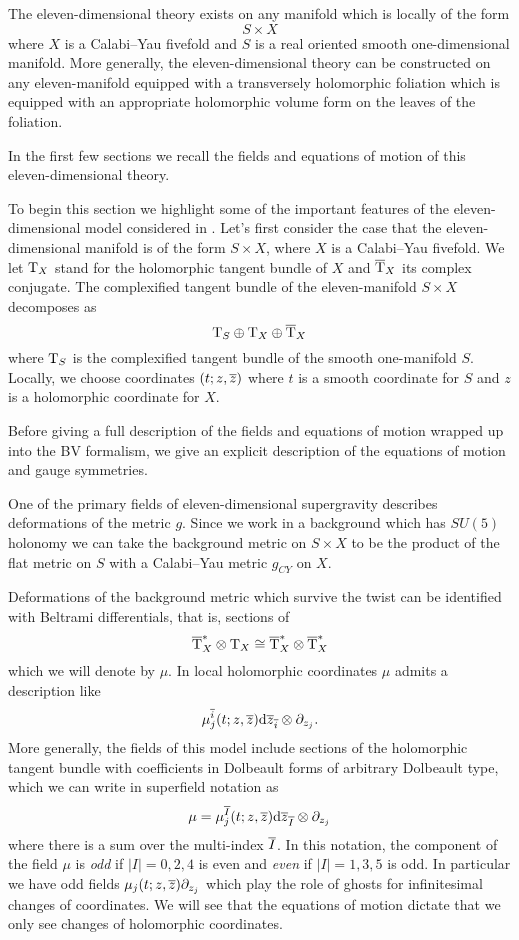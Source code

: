 \documentclass[11pt]{amsart}%
\begin{document}
The eleven-dimensional theory exists on any manifold which is locally of the form 
\[
S \times X 
\] 
where $X$ is a Calabi--Yau fivefold and $S$ is a real oriented smooth one-dimensional manifold.
More generally, the eleven-dimensional theory can be constructed on any eleven-manifold equipped with a transversely holomorphic foliation which is equipped with an appropriate holomorphic volume form on the leaves of the foliation.

In the first few sections we recall the fields and equations of motion of this eleven-dimensional theory. 

%

\parsec[s:sugrafields]

To begin this section we highlight some of the important features of the eleven-dimensional model considered in \cite{RSW}. 
Let's first consider the case that the eleven-dimensional manifold is of the form $S \times X$, where $X$ is a Calabi--Yau fivefold.
We let $\T_X$ stand for the holomorphic tangent bundle of $X$ and $\Bar{\T}_X$ its complex conjugate.
The complexified tangent bundle of the eleven-manifold $S \times X$ decomposes as
\[
\T_S \oplus \T_X \oplus \Bar{\T}_X 
\]
where $\T_S$ is the complexified tangent bundle of the smooth one-manifold $S$.
Locally, we choose coordinates $(t;z,\zbar)$ where $t$ is a smooth coordinate for $S$ and $z$ is a holomorphic coordinate for $X$. 

Before giving a full description of the fields and equations of motion wrapped up into the BV formalism, we give an explicit description of the equations of motion and gauge symmetries. 
 
One of the primary fields of eleven-dimensional supergravity describes deformations of the metric $g$.
Since we work in a background which has $SU(5)$ holonomy we can take the background metric on $S \times X$ to be the product of the flat metric on $S$ with a Calabi--Yau metric $g_{CY}$ on $X$. 

Deformations of the background metric which survive the twist can be identified with Beltrami differentials, that is, sections of 
\[
\Bar{\T}_X^* \otimes \T_X \cong \Bar{\T}^*_X \otimes \Bar{\T}_X^* 
\]
which we will denote by $\mu$. 
In local holomorphic coordinates $\mu$ admits a description like
\[
\mu^{\Bar{i}}_j (t;z,\zbar) \d \zbar_{\Bar{i}} \otimes \del_{z_j} .
\]
More generally, the fields of this model include sections of the holomorphic tangent bundle with coefficients in Dolbeault forms of arbitrary Dolbeault type, which we can write in superfield notation as 
\[
\mu = \mu^{\Bar{I}}_j (t;z,\zbar) \d \zbar_{\Bar{I}} \otimes \del_{z_j}
\]
where there is a sum over the multi-index $\Bar{I}$. 
In this notation, the component of the field $\mu$ is {\em odd} if $|I|=0,2,4$ is even and {\em even} if $|I| = 1,3,5$ is odd.
In particular we have odd fields $\mu_j(t;z,\zbar) \del_{z_j}$ which play the role of ghosts for infinitesimal changes of coordinates.
We will see that the equations of motion dictate that we only see changes of holomorphic coordinates.
\end{document}
